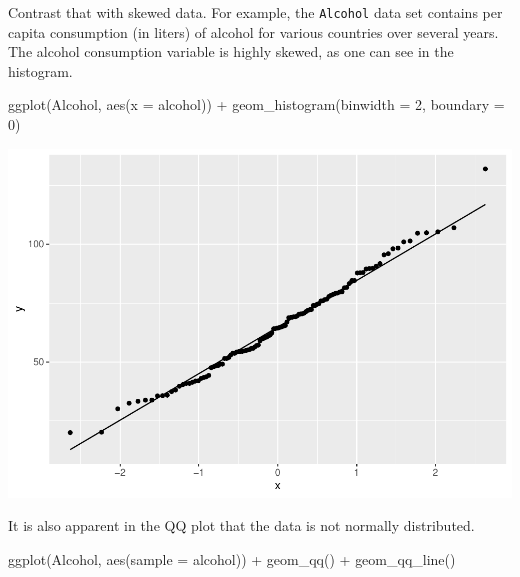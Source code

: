\documentclass[
]{book}
\newenvironment{Shaded}{\begin{snugshade}}{\end{snugshade}}
\newcommand{\AttributeTok}[1]{\textcolor[rgb]{0.77,0.63,0.00}{#1}}
\newcommand{\DecValTok}[1]{\textcolor[rgb]{0.00,0.00,0.81}{#1}}
\newcommand{\FunctionTok}[1]{\textcolor[rgb]{0.00,0.00,0.00}{#1}}
\newcommand{\NormalTok}[1]{#1}
\newcommand{\SpecialCharTok}[1]{\textcolor[rgb]{0.00,0.00,0.00}{#1}}
\begin{document}
Contrast that with skewed data. For example, the \texttt{Alcohol} data set contains per capita consumption (in liters) of alcohol for various countries over several years. The alcohol consumption variable is highly skewed, as one can see in the histogram.

\begin{Shaded}
\begin{Highlighting}[]
\FunctionTok{ggplot}\NormalTok{(Alcohol, }\FunctionTok{aes}\NormalTok{(}\AttributeTok{x =}\NormalTok{ alcohol)) }\SpecialCharTok{+}
    \FunctionTok{geom\_histogram}\NormalTok{(}\AttributeTok{binwidth =} \DecValTok{2}\NormalTok{, }\AttributeTok{boundary =} \DecValTok{0}\NormalTok{)}
\end{Highlighting}
\end{Shaded}

\includegraphics{intro_stats_files/figure-latex/unnamed-chunk-360-1.pdf}

It is also apparent in the QQ plot that the data is not normally distributed.

\begin{Shaded}
\begin{Highlighting}[]
\FunctionTok{ggplot}\NormalTok{(Alcohol, }\FunctionTok{aes}\NormalTok{(}\AttributeTok{sample =}\NormalTok{ alcohol)) }\SpecialCharTok{+}
    \FunctionTok{geom\_qq}\NormalTok{() }\SpecialCharTok{+}
    \FunctionTok{geom\_qq\_line}\NormalTok{()}
\end{Highlighting}
\end{Shaded}
\end{document}
